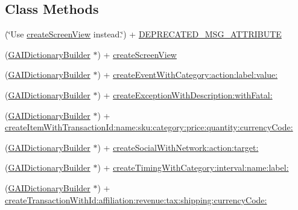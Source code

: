 \subsection*{Class Methods}
\begin{DoxyCompactItemize}
\item 
(\char`\"{}Use \hyperlink{interface_g_a_i_dictionary_builder_ae0fedd6923d4eb6a081b8ad8c301afbe}{create\+Screen\+View} instead.\char`\"{}) + \hyperlink{interface_g_a_i_dictionary_builder_a586dc82641a9c622d590babf88290c10}{D\+E\+P\+R\+E\+C\+A\+T\+E\+D\+\_\+\+M\+S\+G\+\_\+\+A\+T\+T\+R\+I\+B\+U\+TE}
\item 
(\hyperlink{interface_g_a_i_dictionary_builder}{G\+A\+I\+Dictionary\+Builder} $\ast$) + \hyperlink{interface_g_a_i_dictionary_builder_ae0fedd6923d4eb6a081b8ad8c301afbe}{create\+Screen\+View}
\item 
(\hyperlink{interface_g_a_i_dictionary_builder}{G\+A\+I\+Dictionary\+Builder} $\ast$) + \hyperlink{interface_g_a_i_dictionary_builder_a08121b689e4e2eb2ce230b6ebca09cb6}{create\+Event\+With\+Category\+:action\+:label\+:value\+:}
\item 
(\hyperlink{interface_g_a_i_dictionary_builder}{G\+A\+I\+Dictionary\+Builder} $\ast$) + \hyperlink{interface_g_a_i_dictionary_builder_a1fb6d157f764b043b259a7aa2b6b165e}{create\+Exception\+With\+Description\+:with\+Fatal\+:}
\item 
(\hyperlink{interface_g_a_i_dictionary_builder}{G\+A\+I\+Dictionary\+Builder} $\ast$) + \hyperlink{interface_g_a_i_dictionary_builder_a0bb8a0966728ce99b5281281a349e61f}{create\+Item\+With\+Transaction\+Id\+:name\+:sku\+:category\+:price\+:quantity\+:currency\+Code\+:}
\item 
(\hyperlink{interface_g_a_i_dictionary_builder}{G\+A\+I\+Dictionary\+Builder} $\ast$) + \hyperlink{interface_g_a_i_dictionary_builder_aa9a3fd2d74f815fd607bd31586ebbe52}{create\+Social\+With\+Network\+:action\+:target\+:}
\item 
(\hyperlink{interface_g_a_i_dictionary_builder}{G\+A\+I\+Dictionary\+Builder} $\ast$) + \hyperlink{interface_g_a_i_dictionary_builder_a81744404c695f9906eaf6e99eb3ee498}{create\+Timing\+With\+Category\+:interval\+:name\+:label\+:}
\item 
(\hyperlink{interface_g_a_i_dictionary_builder}{G\+A\+I\+Dictionary\+Builder} $\ast$) + \hyperlink{interface_g_a_i_dictionary_builder_af4868766c2fa6c616082f1089057de8c}{create\+Transaction\+With\+Id\+:affiliation\+:revenue\+:tax\+:shipping\+:currency\+Code\+:}
\end{DoxyCompactItemize}


